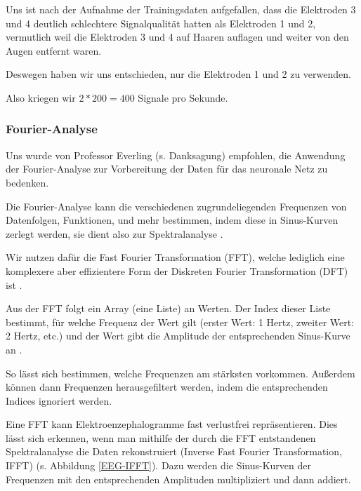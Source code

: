 \documentclass{scrartcl}
\begin{document}
	Uns ist nach der Aufnahme der Trainingsdaten aufgefallen, dass die Elektroden 3 und 4 deutlich schlechtere Signalqualität hatten als Elektroden 1 und 2, vermutlich weil die Elektroden 3 und 4 auf Haaren auflagen und weiter von den Augen entfernt waren.

	Deswegen haben wir uns entschieden, nur die Elektroden 1 und 2 zu verwenden.

	Also kriegen wir $2 * 200 = 400$ Signale pro Sekunde.

	\subsubsection{Fourier-Analyse}
	
	Uns wurde von Professor Everling (s. Danksagung) empfohlen, die Anwendung der Fourier-Analyse zur Vorbereitung der Daten für das neuronale Netz zu bedenken.
	
	Die Fourier-Analyse kann die verschiedenen zugrundeliegenden Frequenzen von Datenfolgen, Funktionen, und mehr bestimmen, indem diese in Sinus-Kurven zerlegt werden, sie dient also zur Spektralanalyse \cite{3b1b:fft}.

	Wir nutzen dafür die Fast Fourier Transformation (FFT), welche lediglich eine komplexere aber effizientere Form der Diskreten Fourier Transformation (DFT) ist \cite{FFT-DFT}.


	Aus der FFT folgt ein Array (eine Liste) an Werten. Der Index dieser Liste bestimmt, für welche Frequenz der Wert gilt (erster Wert: 1 Hertz, zweiter Wert: 2 Hertz, etc.) und der Wert gibt die Amplitude der entsprechenden Sinus-Kurve an \cite{3b1b:fft}.

	So lässt sich bestimmen, welche Frequenzen am stärksten vorkommen. Außerdem können dann Frequenzen herausgefiltert werden, indem die entsprechenden Indices ignoriert werden.

	Eine FFT kann Elektroenzephalogramme fast verlustfrei repräsentieren. Dies lässt sich erkennen, wenn man mithilfe der durch die FFT entstandenen Spektralanalyse die Daten rekonstruiert (Inverse Fast Fourier Transformation, IFFT) (s. Abbildung \ref{EEG-IFFT}). Dazu werden die Sinus-Kurven der Frequenzen mit den entsprechenden Amplituden multipliziert und dann addiert.
\end{document}
